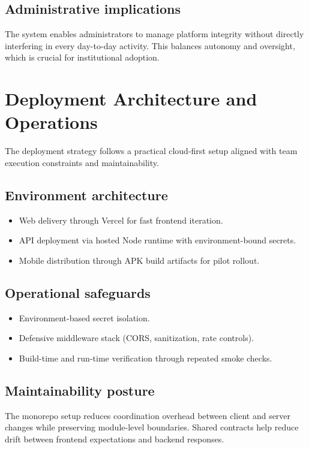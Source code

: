 \documentclass[conference]{IEEEtran}
\begin{document}
\subsection{Administrative implications}
The system enables administrators to manage platform integrity without directly interfering in every day-to-day activity. This balances autonomy and oversight, which is crucial for institutional adoption.

\section{Deployment Architecture and Operations}
The deployment strategy follows a practical cloud-first setup aligned with team execution constraints and maintainability.

\subsection{Environment architecture}
\begin{itemize}
    \item Web delivery through Vercel for fast frontend iteration.
    \item API deployment via hosted Node runtime with environment-bound secrets.
    \item Mobile distribution through APK build artifacts for pilot rollout.
\end{itemize}

\subsection{Operational safeguards}
\begin{itemize}
    \item Environment-based secret isolation.
    \item Defensive middleware stack (CORS, sanitization, rate controls).
    \item Build-time and run-time verification through repeated smoke checks.
\end{itemize}

\subsection{Maintainability posture}
The monorepo setup reduces coordination overhead between client and server changes while preserving module-level boundaries. Shared contracts help reduce drift between frontend expectations and backend responses.
\end{document}
